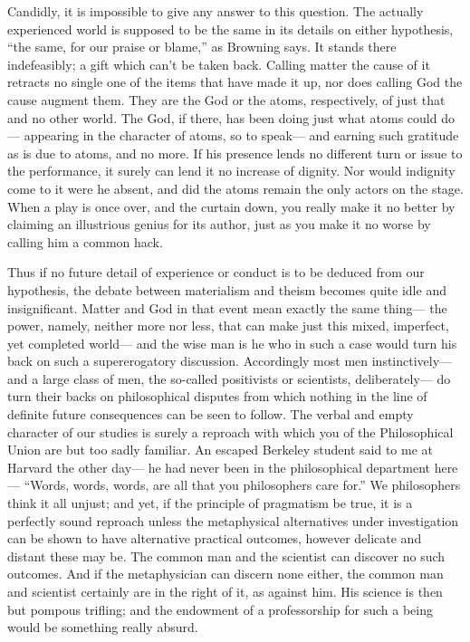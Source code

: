 \documentclass[12pt]{article}
\begin{document}
Candidly, it is impossible to give any answer to this question. The actually experienced world is supposed to be the same in its details on either hypothesis, ``the same, for our praise or blame,'' as Browning says. It stands there indefeasibly; a gift which can't be taken back. Calling matter the cause of it retracts no single one of the items that have made it up, nor does calling God the cause augment them. They are the God or the atoms, respectively, of just that and no other world. The God, if there, has been doing just what atoms could do--- appearing in the character of atoms, so to speak--- and earning such gratitude as is due to atoms, and no more. If his presence lends no different turn or issue to the performance, it surely can lend it no increase of dignity. Nor would indignity come to it were he absent, and did the atoms remain the only actors on the stage. When a play is once over, and the curtain down, you really make it no better by claiming an illustrious genius for its author, just as you make it no worse by calling him a common hack. 

Thus if no future detail of experience or conduct is to be deduced from our hypothesis, the debate between materialism and theism becomes quite idle and insignificant. Matter and God in that event mean exactly the same thing--- the power, namely, neither more nor less, that can make just this mixed, imperfect, yet completed world--- and the wise man is he who in such a case would turn his back on such a supererogatory discussion. Accordingly most men instinctively--- and a large class of men, the so-called positivists or scientists, deliberately--- do turn their backs on philosophical disputes from which nothing in the line of definite future consequences can be seen to follow. The verbal and empty character of our studies is surely a reproach with which you of the Philosophical Union are but too sadly familiar. An escaped Berkeley student said to me at Harvard the other day--- he had never been in the philosophical department here--- ``Words, words, words, are all that you philosophers care for.'' We philosophers think it all unjust; and yet, if the principle of pragmatism be true, it is a perfectly sound reproach unless the metaphysical alternatives under investigation can be shown to have alternative practical outcomes, however delicate and distant these may be. The common man and the scientist can discover no such outcomes. And if the metaphysician can discern none either, the common man and scientist certainly are in the right of it, as against him. His science is then but pompous trifling; and the endowment of a professorship for such a being would be something really absurd. 
\end{document}
